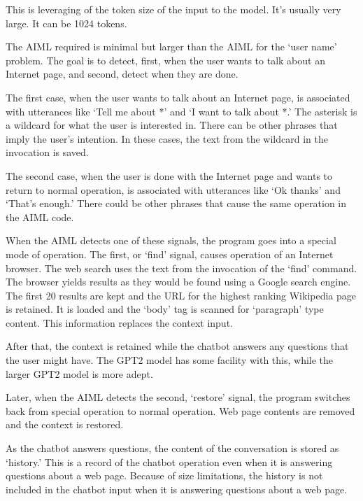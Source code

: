 This is leveraging of the token size of the input to the model. It's usually very large. It can be 1024 tokens.

The AIML required is minimal but larger than the AIML for the `user name' problem. The goal is to detect, first, when the user wants to talk about an Internet page, and second, detect when they are done.

The first case, when the user wants to talk about an Internet page, is associated with utterances like `Tell me about *' and `I want to talk about *.' The asterisk is a wildcard for what the user is interested in. There can be other phrases that imply the user's intention. In these cases, the text from the wildcard in the invocation is saved.

The second case, when the user is done with the Internet page and wants to return to normal operation, is associated with utterances like `Ok thanks' and `That's enough.' 
There could be other phrases that cause the same operation in the AIML code.

When the AIML detects one of these signals, the program goes into a special mode of operation. The first, or `find' signal, causes operation of an Internet browser. The web search uses the text from the invocation of the `find' command. The browser yields results as they would be found using a Google search engine. The first 20 results are kept and the URL for the highest ranking Wikipedia page is retained. It is loaded and the `body' tag is scanned for `paragraph' type content. This information replaces the context input. 

After that, the context is retained while the chatbot answers any questions that the user might have. The GPT2 model has some facility with this, while the larger GPT2 model is more adept.

Later, when the AIML detects the second, `restore' signal, the program switches back from special operation to normal operation. Web page contents are removed and the context is restored. %

As the chatbot answers questions, the content of the conversation is stored as `history.' %
This is a record of the chatbot operation even when it is answering questions about a web page. %
Because of size limitations, the history is not included in the chatbot input when it is answering questions about a web page. %

